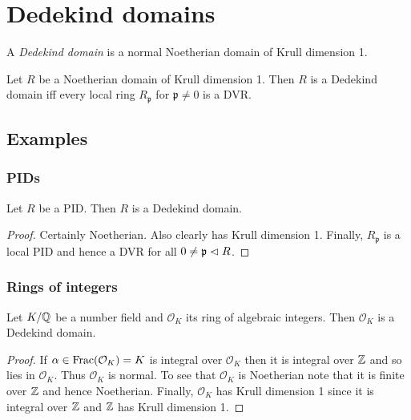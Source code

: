 \documentclass{memoir}
\begin{document}
\section{Dedekind domains}
\begin{definition}
    A \textit{Dedekind domain} is a normal Noetherian domain of Krull dimension 1.
\end{definition}
\begin{lemma}
    Let $R$ be a Noetherian domain of Krull dimension 1.
    Then $R$ is a Dedekind domain iff every local ring $R_{\mathfrak p}$ for $\mathfrak p \ne 0$ is a DVR.
\end{lemma}
\subsection{Examples}
\subsubsection{PIDs}
\begin{thm}
    Let $R$ be a PID. Then $R$ is a Dedekind domain.
\end{thm}
\begin{proof}
    Certainly Noetherian.
    Also clearly has Krull dimension 1.
    Finally, $R_{\mathfrak p}$ is a local PID and hence a DVR for all $0\ne \mathfrak p\vartriangleleft R$.
\end{proof}
\subsubsection{Rings of integers}
\begin{thm}
    Let $K/\mathbb{Q}$ be a number field and $\mathcal O_K$ its ring of algebraic integers.
    Then $\mathcal O_K$ is a Dedekind domain.
\end{thm}
\begin{proof}
    If $\alpha \in \text{Frac}(\mathcal O_K) = K$ is integral over $\mathcal O_K$ then it is integral over $\mathbb{Z}$ and so lies in $\mathcal O_K$.
    Thus $\mathcal O_K$ is normal.
    To see that $\mathcal O_K$ is Noetherian note that it is finite over $\mathbb{Z}$ and hence Noetherian.
    Finally, $\mathcal O_K$ has Krull dimension 1 since it is integral over $\mathbb{Z}$ and $\mathbb{Z}$ has Krull dimension 1.
\end{proof}
\end{document}
